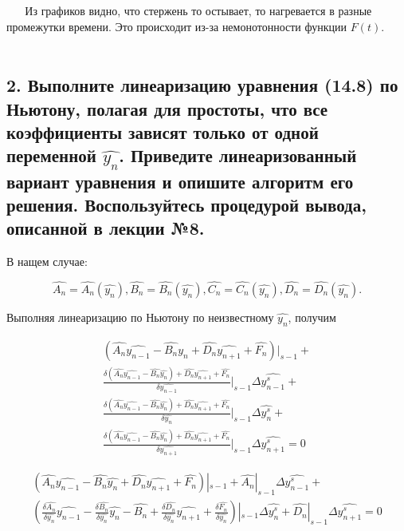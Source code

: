 \documentclass[a4paper,12pt]{article}
\begin{document}
 	
 	\linebreak Из графиков видно, что стержень то остывает, то нагревается в разные промежутки времени. Это происходит из-за немонотонности функции $F(t)$.
 
 	\newpage
 
	 \subsection*{2. Выполните линеаризацию уравнения (14.8) по Ньютону, полагая для простоты, что все коэффициенты зависят только от одной переменной $\widehat{y_n}$. Приведите линеаризованный вариант уравнения и опишите алгоритм его решения. Воспользуйтесь процедурой вывода, описанной в лекции №8.}
	
	В нащем случае:
	
	\[
	\widehat{A_n} = \widehat{A_n}(\widehat{y_n}), \widehat{B_n} = \widehat{B_n}(\widehat{y_n}), \widehat{C_n} = \widehat{C_n}(\widehat{y_n}), \widehat{D_n} = \widehat{D_n}(\widehat{y_n}).
	\]
	
	Выполняя линеаризацию по Ньютону по неизвестному $\widehat{y_n}$, получим
	
	\begin{eqnarray}
	(\widehat{A_n}\widehat{y_{n - 1}} - \widehat{B_n}\widehat{y_{n}}  + \widehat{D_n}\widehat{y_{n + 1}} + \widehat{F_n})|_{s-1} + \nonumber \\
	\frac{\delta (\widehat{A_n}\widehat{y_{n - 1}} - \widehat{B_n}\widehat{y_n}) + \widehat{D_n}\widehat{y_{n + 1}} + \widehat{F_n}}{\delta \widehat{y_{n - 1}}}|_{s-1} \Delta \widehat{y_{n - 1}^s} + \nonumber \\
	\frac{\delta (\widehat{A_n}\widehat{y_{n - 1}} - \widehat{B_n}\widehat{y_n}) + \widehat{D_n}\widehat{y_{n + 1}} + \widehat{F_n}}{\delta \widehat{y_{n}}}|_{s-1} \Delta \widehat{y_{n}^s} +  \nonumber \\
	\frac{\delta (\widehat{A_n}\widehat{y_{n - 1}} - \widehat{B_n}\widehat{y_n}) + \widehat{D_n}\widehat{y_{n + 1}} + \widehat{F_n}}{\delta \widehat{y_{n + 1}}}|_{s-1} \Delta \widehat{y_{n + 1}^s} = 0
	\end{eqnarray}
	
	\begin{eqnarray}
	(\widehat{A_n}\widehat{y_{n - 1}} - \widehat{B_n}\widehat{y_{n}}  + \widehat{D_n}\widehat{y_{n + 1}} + \widehat{F_n})|_{s-1} + \widehat{A_n}|_{s-1}\Delta \widehat{y_{n - 1}^s} + \nonumber \\
	\left(
	\frac{\delta \widehat{A_n}}{\delta \widehat{y_n}} \widehat{y_{n - 1}} - \frac{\delta \widehat{B_n}}{\delta \widehat{y_n}}\widehat{y_n} - \widehat{B_n} + \frac{\delta \widehat{D_n}}{\delta \widehat{y_n}}\widehat{y_{n + 1}} + \frac{\delta \widehat{F_n}}{\delta \widehat{y_n}}\right)|_{s - 1}\Delta \widehat{y_n^s} + \widehat{D_n}|_{s - 1} \Delta \widehat{y_{n + 1}^s} = 0
	\end{eqnarray}
	
\end{document}
